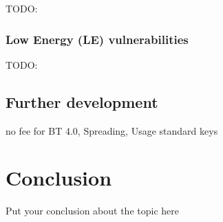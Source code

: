 \documentclass[12pt,a4paper]{article}
\begin{document}
TODO: \cite{DBLP:journals/esl/DardanelliMTZSKH13} \cite{DBLP:conf/automotiveSS/JakobKSGMSF12}

\subsubsection{Low Energy (LE) vulnerabilities}
TODO: \cite{DBLP:conf/woot/Ryan13} \cite{DBLP:conf/greencom/XuZLMLCSTY13}

\subsection{Further development}
no fee for BT 4.0, Spreading, Usage standard keys

\section{Conclusion}
Put your conclusion about the topic here



{}

\end{document}
